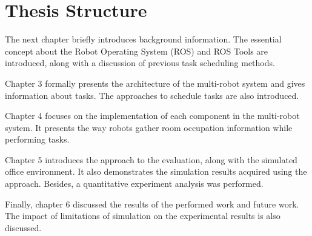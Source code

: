 \section{Thesis Structure}

The next chapter briefly introduces background information. The essential concept about the Robot Operating System (ROS) and ROS Tools are introduced, along with a discussion of previous task scheduling methods.

Chapter 3 formally presents the architecture of the multi-robot system and gives information about tasks. The approaches to schedule tasks are also introduced.

Chapter 4 focuses on the implementation of each component in the multi-robot system. It presents the way robots gather room occupation information while performing tasks. 

Chapter 5 introduces the approach to the evaluation, along with the simulated office environment. It also demonstrates the simulation results acquired using the approach. Besides, a quantitative experiment analysis was performed.

Finally, chapter 6 discussed the results of the performed work and future work. The impact of limitations of simulation on the experimental results is also discussed.






